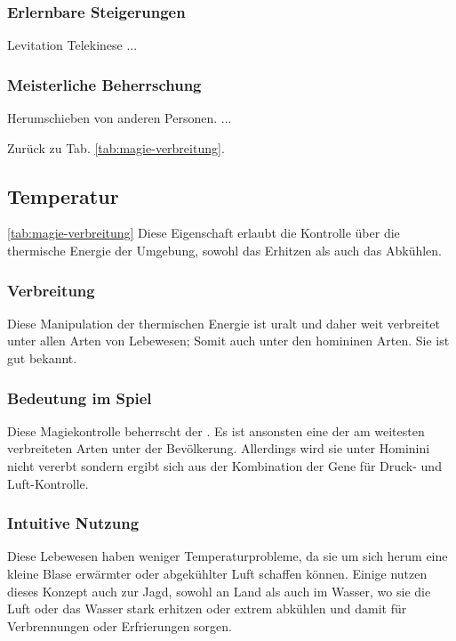 \subsubsection{Erlernbare Steigerungen}
\begin{outline}
	\1 Levitation
	\1 Telekinese
	\1 ...
\end{outline}

\subsubsection{Meisterliche Beherrschung} 
\begin{outline}
	\1 Herumschieben von anderen Personen.
	\1 ...
\end{outline}
Zurück zu Tab. \ref{tab:magie-verbreitung}.



\subsection{Temperatur}\label{sec:temperaturmagie} \ref{tab:magie-verbreitung}
Diese Eigenschaft erlaubt die Kontrolle über die thermische Energie der Umgebung, sowohl das Erhitzen als auch das Abkühlen.

\subsubsection{Verbreitung}
Diese Manipulation der thermischen Energie ist uralt und daher weit verbreitet unter allen Arten von Lebewesen; Somit auch unter den homininen Arten. Sie ist gut bekannt.

\subsubsection{Bedeutung im Spiel}
Diese Magiekontrolle beherrscht der . Es ist ansonsten eine der am weitesten verbreiteten Arten unter der Bevölkerung. Allerdings wird sie unter Hominini nicht vererbt sondern ergibt sich aus der Kombination der Gene für Druck- und Luft-Kontrolle.

\subsubsection{Intuitive Nutzung}
Diese Lebewesen haben weniger Temperaturprobleme, da sie um sich herum eine kleine Blase erwärmter oder abgekühlter Luft schaffen können. Einige nutzen dieses Konzept auch zur Jagd, sowohl an Land als auch im Wasser, wo sie die Luft oder das Wasser stark erhitzen oder extrem abkühlen und damit für Verbrennungen oder Erfrierungen sorgen.

